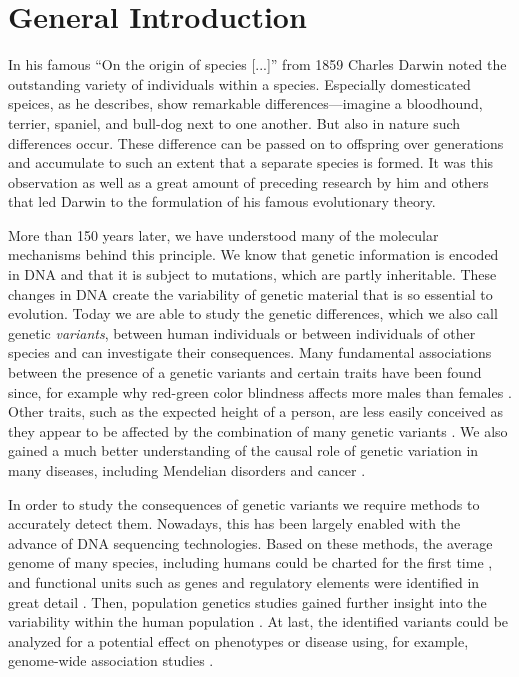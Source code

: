 \chapter{General Introduction}
\label{sec:intro}

In his famous ``On the origin of species [...]'' from 1859 Charles Darwin noted
the outstanding variety of individuals within a species. Especially domesticated
speices, as he describes, show remarkable differences---imagine a bloodhound,
terrier, spaniel, and bull-dog next to one another. But also in nature such
differences occur. These difference can be passed on to offspring over
generations and accumulate to such an extent that a separate species is formed.
It was this observation as well as a great amount of preceding research by him
and others that led Darwin to the formulation of his famous evolutionary theory.

More than 150 years later, we have understood many of the molecular mechanisms
behind this principle. We know that genetic information is encoded in DNA and
that it is subject to mutations, which are partly inheritable. These changes in
DNA create the variability of genetic material that is so essential to
evolution. Today we are able to study the genetic differences,
which we also call genetic \emph{variants},
between human individuals or between individuals of other species and can investigate
their consequences. Many fundamental associations between the presence of a
genetic variants and certain traits have been found since, for example why
red-green color blindness affects more males than females \citep{Nathans1986}.
Other traits, such as the expected height of a person, are less easily conceived
as they appear to be affected by the combination of many genetic variants
\citep{Wood2014,Marouli2017}. We also gained a much better understanding of the
causal role of genetic variation in many diseases, including Mendelian disorders
and cancer \citep{Stankiewicz2010}.

In order to study the consequences of genetic variants we require
methods to accurately detect them. Nowadays, this has been largely enabled with
the advance of DNA sequencing technologies. Based on these methods, the average
genome of many species, including humans could be charted for the first time
\citep{Lander2001,Venter2001}, and functional units such as genes and regulatory
elements were identified in great detail \citep{Dunham2012}. Then, population
genetics studies gained further insight into the variability within the human
population \citep{Auton2015,Sudmant2015}.
At last, the identified variants could be analyzed for a potential effect on
phenotypes or disease using, for example, genome-wide association studies
\citep{Ott2015,MacArthur2017}.

